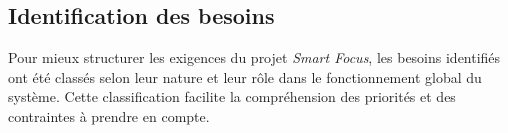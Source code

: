 

\subsection{Identification des besoins}

Pour mieux structurer les exigences du projet \textit{Smart Focus}, les besoins identifiés ont été classés selon leur nature et leur rôle dans le fonctionnement global du système. Cette classification facilite la compréhension des priorités et des contraintes à prendre en compte.

